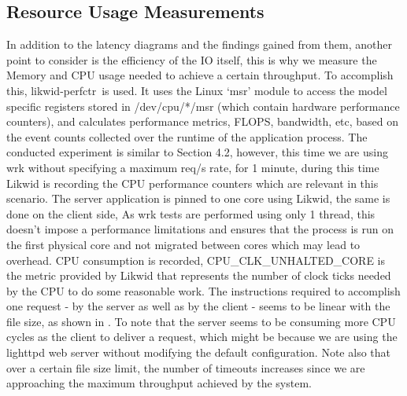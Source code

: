 \documentclass[runningheads]{llncs}
\begin{document}
\subsection{Resource Usage Measurements}
In addition to the latency diagrams and the findings gained from them, another point to consider is the efficiency of the IO itself, this is why we measure the Memory and CPU usage needed to achieve a certain throughput. To accomplish this, likwid-perfctr\,\cite{likwid} is used. It uses the Linux ‘msr’ module to access the model specific registers stored in /dev/cpu/*/msr (which contain hardware performance counters), and calculates performance metrics, FLOPS, bandwidth, etc, based on the event counts collected over the runtime of the application process.
The conducted experiment is similar to Section 4.2, however, this time we are using wrk\cite{wrkURL} without specifying a maximum req/s rate, for 1 minute, during this time Likwid is recording the CPU performance counters which are relevant in this scenario. The server application is pinned to one core using Likwid, the same is done on the client side, As wrk tests are performed using only 1 thread, this doesn’t impose a performance limitations and ensures that the process is run on the first physical core and not migrated between cores which may lead to overhead. 
CPU consumption is recorded, CPU\_CLK\_UNHALTED\_CORE is the metric provided by Likwid that represents the number of clock ticks needed by the CPU to do some reasonable work. The instructions required to accomplish one request - by the server as well as by the client - seems to be linear with the file size, as shown in . To note that the server seems to be consuming more CPU cycles as the client to deliver a request, which might be because we are using the lighttpd web server without modifying the default configuration. Note also that over a certain file size limit, the number of timeouts increases since we are approaching the maximum throughput achieved by the system.
\end{document}
